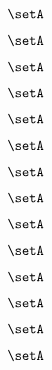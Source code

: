 \begin{forslides}
    \begin{equation}
        \label{eq:feedback-176}
        \setA
    \end{equation}

    \begin{equation}
        \label{eq:feedback-177}
        \setA
    \end{equation}

    \begin{equation}
        \label{eq:feedback-178}
        \setA
    \end{equation}

    \begin{equation}
        \label{eq:feedback-179}
        \setA
    \end{equation}

    \begin{equation}
        \label{eq:feedback-180}
        \setA
    \end{equation}

    \begin{equation}
        \label{eq:feedback-181}
        \setA
    \end{equation}

    \begin{equation}
        \label{eq:feedback-182}
        \setA
    \end{equation}

    \begin{equation}
        \label{eq:feedback-183}
        \setA
    \end{equation}

    \begin{equation}
        \label{eq:feedback-184}
        \setA
    \end{equation}

    \begin{equation}
        \label{eq:feedback-185}
        \setA
    \end{equation}

    \begin{equation}
        \label{eq:feedback-186}
        \setA
    \end{equation}

    \begin{equation}
        \label{eq:feedback-187}
        \setA
    \end{equation}

    \begin{equation}
        \label{eq:feedback-188}
        \setA
    \end{equation}

    \begin{equation}
        \label{eq:feedback-189}
        \setA
    \end{equation}

\end{forslides}